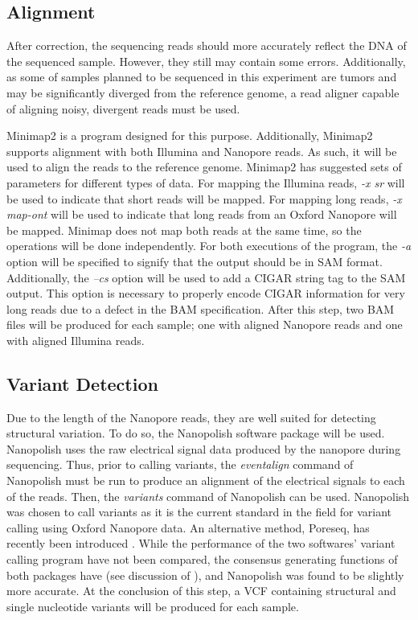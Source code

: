 \subsection{Alignment}

After correction, the sequencing reads should more accurately reflect the DNA of the sequenced sample. However, they still may contain some errors. Additionally, as some of samples planned to be sequenced in this experiment are tumors and may be significantly diverged from the reference genome, a read aligner capable of aligning noisy, divergent reads must be used.

Minimap2 is a program designed for this purpose. Additionally, Minimap2 supports alignment with both Illumina and Nanopore reads. As such, it will be used to align the reads to the reference genome.
Minimap2 has suggested sets of parameters for different types of data. For mapping the Illumina reads, \textit{-x sr} will be used to indicate that short reads will be mapped. For mapping long reads, \textit{-x map-ont} will be used to indicate that long reads from an Oxford Nanopore will be mapped. Minimap does not map both reads at the same time, so the operations will be done independently. For both executions of the program, the \textit{-a} option will be specified to signify that the output should be in SAM format. Additionally, the \textit{--cs} option will be used to add a CIGAR string tag to the SAM output. This option is necessary to properly encode CIGAR information for very long reads due to a defect in the BAM specification. After this step, two BAM files will be produced for each sample; one with aligned Nanopore reads and one with aligned Illumina reads.

\subsection{Variant Detection}

Due to the length of the Nanopore reads, they are well suited for detecting structural variation. To do so, the Nanopolish software package will be used. Nanopolish uses the raw electrical signal data produced by the nanopore during sequencing. Thus, prior to calling variants, the \textit{eventalign} command of Nanopolish must be run to produce an alignment of the electrical signals to each of the reads. Then, the \textit{variants} command of Nanopolish can be used. Nanopolish was chosen to call variants as it is the current standard in the field for variant calling using Oxford Nanopore data. An alternative method, Poreseq, has recently been introduced \parencite{szalay_novo_2015}. While the performance of the two softwares' variant calling program have not been compared, the consensus generating functions of both packages have (see discussion of \cite{szalay_novo_2015}), and Nanopolish was found to be slightly more accurate. At the conclusion of this step, a VCF containing structural and single nucleotide variants will be produced for each sample.

